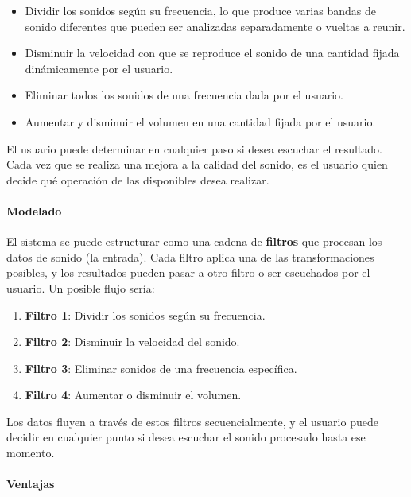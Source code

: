 	\begin{itemize}
		\item Dividir los sonidos según su frecuencia, lo que produce
			varias bandas de sonido diferentes que pueden ser analizadas
			separadamente o vueltas a reunir.

		\item Disminuir la velocidad con que se reproduce el sonido de una
			cantidad fijada dinámicamente por el usuario.

		\item Eliminar todos los sonidos de una frecuencia dada por el usuario.

		\item Aumentar y disminuir el volumen en una cantidad fijada por el
			usuario.
	\end{itemize}

	El usuario puede determinar en cualquier paso si desea escuchar el
	resultado. Cada vez que se realiza una mejora a la calidad del sonido,
	es el usuario quien decide qué operación de las disponibles desea
	realizar.

	\paragraph{Modelado}

	El sistema se puede estructurar como una cadena de \textbf{filtros}
	que procesan los datos de sonido (la entrada). Cada filtro aplica
	una de las transformaciones posibles, y los resultados pueden pasar
	a otro filtro o ser escuchados por el usuario. Un posible flujo
	sería:

	\begin{enumerate}
		\item \textbf{Filtro 1}: Dividir los sonidos según su frecuencia.

		\item \textbf{Filtro 2}: Disminuir la velocidad del sonido.

		\item \textbf{Filtro 3}: Eliminar sonidos de una frecuencia específica.

		\item \textbf{Filtro 4}: Aumentar o disminuir el volumen.
	\end{enumerate}

	Los datos fluyen a través de estos filtros secuencialmente, y el
	usuario puede decidir en cualquier punto si desea escuchar el
	sonido procesado hasta ese momento.

	\paragraph{Ventajas}

